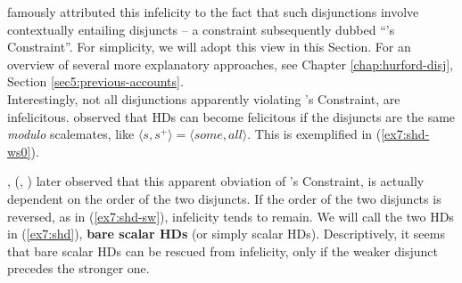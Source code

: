 \begin{exe}
	\ex\label{ex7:hd}
	\begin{xlist}
		\label{ex7:hd-ws}
		\label{ex7:hd-sw}
	\end{xlist}
\end{exe}

\citeauthor{Hurford1974} famously attributed this infelicity to the fact that such disjunctions involve contextually entailing disjuncts -- a constraint subsequently dubbed ``\citeauthor{Hurford1974}'s Constraint''. For simplicity, we will adopt this view in this Section. For an overview of several more explanatory approaches, see Chapter \ref{chap:hurford-disj}, Section \ref{sec5:previous-accounts}.\\

Interestingly, not all disjunctions apparently violating \citeauthor{Hurford1974}'s Constraint, are infelicitous. \citet{Gazdar1979} observed that HDs can become felicitous if the disjuncts are the same \textit{modulo} scalemates, like $\langle s, s^+ \rangle = \langle \textit{some}, \textit{all} \rangle$. This is exemplified in (\ref{ex7:shd-ws0}).


\begin{exe}
	\label{ex7:shd-ws0}
\end{exe}

\citeauthor{Singh2008}, (\citeyear{Singh2008a}, \citeyear{Singh2008b}) later observed that this apparent obviation of \citeauthor{Hurford1974}'s Constraint, is actually dependent on the order of the two disjuncts. If the order of the two disjuncts is reversed, as in (\ref{ex7:shd-sw}), infelicity tends to remain. We will call the two HDs in (\ref{ex7:shd}), \textbf{bare scalar HDs} (or simply scalar HDs). Descriptively, it seems that bare scalar HDs can be rescued from infelicity, only if the weaker disjunct precedes the stronger one.


\begin{exe}
	\ex\label{ex7:shd}
	\begin{xlist}
		\label{ex7:shd-ws}
		\label{ex7:shd-sw}
	\end{xlist}
\end{exe}

